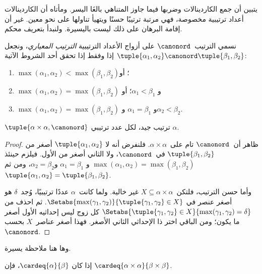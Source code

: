 \documentclass[../../../include/open-logic-section]{subfiles}
\begin{document}


يتبين أن جمع الكاردينالات وضربها فيما جاوز المتناهي بالغَا اليسر.
ومأتاه أن الكاردينالات أعداد ترتيبية مخصوصة، فهي مرتبة ترتيبًا حسنًا
ويتهيأ تناولها على نحو معين. غير أن إقامة البرهان على ذلك ليست باليسيرة.
ولنبدأ بتعريف محكم.

\begin{defn}
نسمي الترتيب~$\canonord$ على أزواج الأعداد الترتيبية
\emph{الترتيب المعياري}، ونجعل
$\tuple{\alpha_1, \alpha_2} \canonord
\tuple{\beta_1, \beta_2}$ إذا وفقط إذا تحقق أحد الشروط الآتية:
\begin{enumerate}
	\item $\max(\alpha_1, \alpha_2) < \max(\beta_1, \beta_2)$؛ أو
	\item $\max(\alpha_1, \alpha_2) = \max(\beta_1, \beta_2)$ و
	$\alpha_1 < \beta_1$؛ أو
	\item $\max(\alpha_1, \alpha_2) = \max(\beta_1, \beta_2)$ و
	$\alpha_1 = \beta_1$ و$\alpha_2 < \beta_2$.
\end{enumerate}
\end{defn}

\begin{lem}
$\tuple{\alpha \times \alpha, \canonord}$ ترتيب جيد، لكل عدد ترتيبي
$\alpha$.
\end{lem}

\begin{proof}
ظاهر أن~$\canonord$ تام على~$\alpha \times \alpha$. فلنفرض أنه لا
$\tuple{\alpha_1, \alpha_2}$ أصغر من
$\tuple{\beta_1, \beta_2}$ في~$\canonord$، ولا الثاني أصغر من الأول.
فيلزم حينئذ
$\max(\alpha_1, \alpha_2) = \max(\beta_1, \beta_2)$ و
$\alpha_1 = \beta_1$ و$\alpha_2 = \beta_2$، ومن ثم
$\tuple{\alpha_1, \alpha_2} = \tuple{\beta_1, \beta_2}$.

وأما حسن الترتيب، فلتكن~$X \subseteq \alpha\times\alpha$ غير
خالية. ولما كانت~$\alpha$ عددًا ترتيبيًا، وُجد~$\delta$ هو أصغر عنصر في
$\Setabs{\max(\gamma_1, \gamma_2)}{\tuple{\gamma_1,
\gamma_2} \in X}$. ثم احذف من
$\Setabs{\tuple{\gamma_1,\gamma_2} \in X}{\max(\gamma_1, \gamma_2) =
\delta}$ كل زوج ليس إحداثيه الأول أصغر ما يكون؛ ومن الباقي اختر ذا
الإحداثي الثاني الأصغر. فهذا أصغر عناصر~$X$ بحسب~$\canonord$.
\end{proof}
\noindent
وها هنا ملاحظة يسيرة.

\begin{prop}
إذا كان $\cardeq{\alpha}{\beta}$، فإن
$\cardeq{\alpha \times \alpha}{\beta \times \beta}$.
\end{prop}
\end{document}
